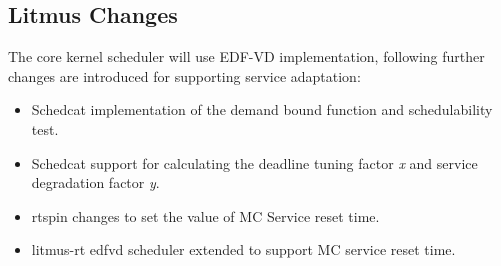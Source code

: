 \subsection{Litmus Changes}
The core kernel scheduler will use EDF-VD implementation, following further changes are introduced for supporting service adaptation:
\begin{itemize}
	\item Schedcat implementation of the demand bound function and schedulability test.
	\item Schedcat support for calculating the deadline tuning factor \textit{x} and service degradation factor \textit{y}.
	\item rtspin changes to set the value of MC Service reset time.
	\item litmus-rt edfvd scheduler extended to support MC service reset time. 
\end{itemize}